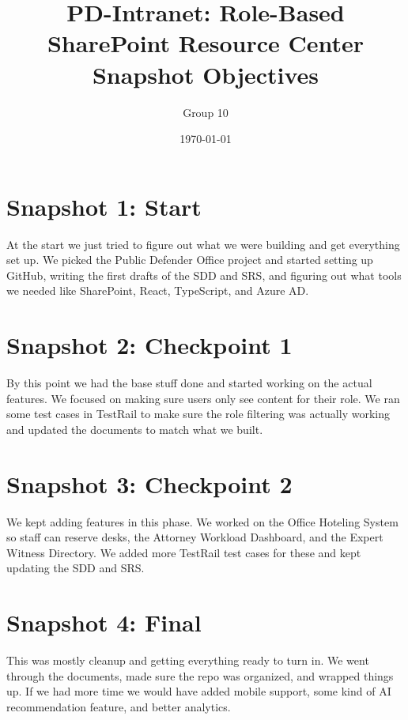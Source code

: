 \documentclass[12pt]{article}
\title{PD-Intranet: Role-Based SharePoint Resource Center \\ \large Snapshot Objectives}
\author{Group 10}
\date{\today}
\begin{document}
\maketitle
\tableofcontents
\newpage

\section{Snapshot 1: Start}
At the start we just tried to figure out what we were building and get everything set up. We picked the Public Defender Office project and started setting up GitHub, writing the first drafts of the SDD and SRS, and figuring out what tools we needed like SharePoint, React, TypeScript, and Azure AD.

\section{Snapshot 2: Checkpoint 1}
By this point we had the base stuff done and started working on the actual features. We focused on making sure users only see content for their role. We ran some test cases in TestRail to make sure the role filtering was actually working and updated the documents to match what we built.

\section{Snapshot 3: Checkpoint 2}
We kept adding features in this phase. We worked on the Office Hoteling System so staff can reserve desks, the Attorney Workload Dashboard, and the Expert Witness Directory. We added more TestRail test cases for these and kept updating the SDD and SRS.

\section{Snapshot 4: Final}
This was mostly cleanup and getting everything ready to turn in. We went through the documents, made sure the repo was organized, and wrapped things up. If we had more time we would have added mobile support, some kind of AI recommendation feature, and better analytics.
\end{document}
